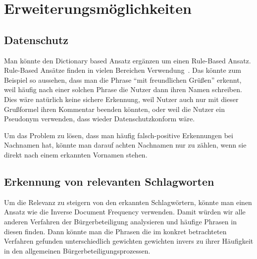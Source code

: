 \documentclass[runningheads]{llncs}
\begin{document}
\section{Erweiterungsmöglichkeiten}
	\subsection{Datenschutz}
		Man könnte den Dictionary based Ansatz ergänzen um einen Rule-Based Ansatz.
		Rule-Based Ansätze finden in vielen Bereichen Verwendung~\cite{mahmud2015rule}.
		Das könnte zum Beispiel so aussehen, dass man die Phrase ``mit freundlichen Grüßen'' erkennt, weil häufig nach einer solchen Phrase die Nutzer dann ihren Namen schreiben.
		Dies wäre natürlich keine sichere Erkennung, weil Nutzer auch nur mit dieser Grußformel ihren Kommentar beenden könnten, oder weil die Nutzer ein Pseudonym verwenden, dass wieder Datenschutzkonform wäre.
		
		Um das Problem zu lösen, dass man häufig falsch-positive Erkennungen bei Nachnamen hat, könnte man darauf achten Nachnamen nur zu zählen, wenn sie direkt nach einem erkannten Vornamen stehen.
	\subsection{Erkennung von relevanten Schlagworten}
		Um die Relevanz zu steigern von den erkannten Schlagwörtern, könnte man einen Ansatz wie die Inverse Document Frequency verwenden.
		Damit würden wir alle anderen Verfahren der Bürgerbeteiligung analysieren und häufige Phrasen in diesen finden.
		Dann könnte man die Phrasen die im konkret betrachteten Verfahren gefunden unterschiedlich gewichten gewichten invers zu ihrer Häufigkeit in den allgemeinen Bürgerbeteiligungsprozessen. %

	
	
\end{document}
